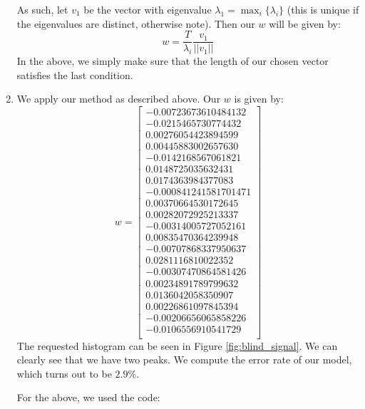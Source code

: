 \documentclass[12pt]{exam}
\begin{document}
\begin{questions}
\begin{solution}
\begin{enumerate}[label=(\alph*)]
        As such, let $v_1$ be the vector with eigenvalue $\lambda_1 = \max_i\{\lambda_i\}$ (this is unique if the eigenvalues are distinct, otherwise note). Then our $w$ will be given by:
        \[
          w = \frac{T}{\lambda_i} \frac{v_1}{||v_1||}
        \]
        In the above, we simply make sure that the length of our chosen vector satisfies the last condition.

      \item
        We apply our method as described above. Our $w$ is given by:
        \[
          w = 
            \begin{bmatrix}
              -0.00723673610484132 \\
              -0.0215465730774432 \\
              0.00276054423894599 \\
              0.00445883002657630 \\
              -0.0142168567061821 \\
              0.0148725035632431 \\
              0.0174363984377083 \\
              -0.000841241581701471 \\
              0.00370664530172645 \\
              0.00282072925213337 \\
              -0.00314005727052161 \\
              0.00835470364239948 \\
              -0.00707868337950637 \\
              0.0281116810022352 \\
              -0.00307470864581426 \\
              0.00234891789799632 \\
              0.0136042058350907 \\
              0.00226861097845394 \\
              -0.00206656065858226 \\
              -0.0106556910541729 \\
            \end{bmatrix}
        \]
        The requested histogram can be seen in Figure \ref{fig:blind_signal}. We can clearly see that we have two peaks. We compute the error rate of our model, which turns out to be $2.9\%$.


        For the above, we used the code:
        
    \end{enumerate}
  \end{solution}


\end{questions}
\end{document}
